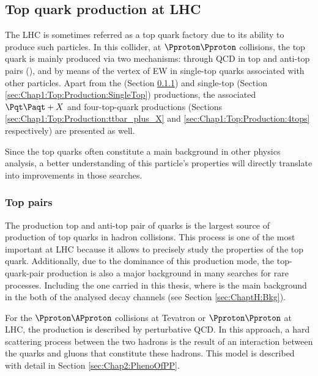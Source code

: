 \subsection{Top quark production at LHC}
\label{sec:Chap1:Top:Production}
The LHC is sometimes referred as a top quark factory due to its ability to produce such particles. 
In this collider, at $\Pproton\Pproton$ collisions, the top quark is mainly produced via
two mechanisms: through QCD in top and anti-top pairs (\ttbar), and by means of the \Wtb 
vertex of EW in single-top quarks associated with other particles.  
Apart from the \ttbar (Section \ref{sec:Chap1:Top:Production:TopPairs}) and single-top
(Section \ref{sec:Chap1:Top:Production:SingleTop}) productions, the associated $\ttbar+X$
and four-top-quark productions (Sections \ref{sec:Chap1:Top:Production:ttbar_plus_X} and 
\ref{sec:Chap1:Top:Production:4tops} respectively) are presented as well.

Since the top quarks often constitute a main background in other physics analysis, 
a better understanding of this particle's properties will directly translate into improvements 
in those searches.

\subsubsection{Top pairs}
\label{sec:Chap1:Top:Production:TopPairs}
The production top and anti-top pair of quarks is the largest source of production of top quarks in hadron collisions. This
process is one of the most important at LHC because it allows to precisely study the properties of the top quark. 
Additionally, due to the dominance of this production mode, the top-quark-pair production is also a major background 
in many searches for rare processes. Including the one carried in this thesis, where \ttbar is the main background in
the both of the analysed decay channels (see Section \ref{sec:ChaptH:Bkg}).

For the $\Pproton \APproton$ collisions at Tevatron or $\Pproton \Pproton$ at LHC, the \ttbar production is described by
perturbative QCD.  In this approach, a hard scattering process between the two hadrons is the result 
of an interaction between the quarks and gluons that constitute these hadrons. This model is described with detail in 
Section \ref{sec:Chap2:PhenoOfPP}.



